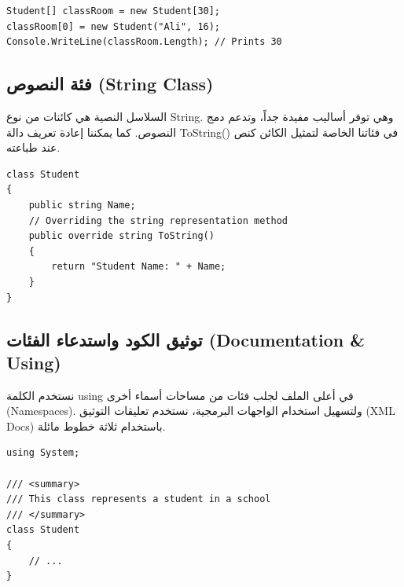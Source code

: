 \documentclass[14pt]{extarticle}
\begin{document}
\begin{boxExample}
\begin{english}
\begin{verbatim}
Student[] classRoom = new Student[30];
classRoom[0] = new Student("Ali", 16);
Console.WriteLine(classRoom.Length); // Prints 30
\end{verbatim}
\end{english}
\end{boxExample}

\subsection{فئة النصوص (\textenglish{String Class})}
السلاسل النصية هي كائنات من نوع \textenglish{String}. وهي توفر أساليب مفيدة جداً، وتدعم دمج النصوص. كما يمكننا إعادة تعريف دالة \textenglish{ToString()} في فئاتنا الخاصة لتمثيل الكائن كنص عند طباعته.

\begin{boxExample}
\begin{english}
\begin{verbatim}
class Student
{
    public string Name;
    // Overriding the string representation method
    public override string ToString()
    {
        return "Student Name: " + Name;
    }
}
\end{verbatim}
\end{english}
\end{boxExample}

\subsection{توثيق الكود واستدعاء الفئات (\textenglish{Documentation \& Using})}
نستخدم الكلمة \textenglish{using} في أعلى الملف لجلب فئات من مساحات أسماء أخرى (\textenglish{Namespaces}). ولتسهيل استخدام الواجهات البرمجية، نستخدم تعليقات التوثيق (\textenglish{XML Docs}) باستخدام ثلاثة خطوط مائلة.

\begin{boxExample}
\begin{english}
\begin{verbatim}
using System;

/// <summary>
/// This class represents a student in a school
/// </summary>
class Student
{
    // ...
}
\end{verbatim}
\end{english}
\end{boxExample}
\end{document}
